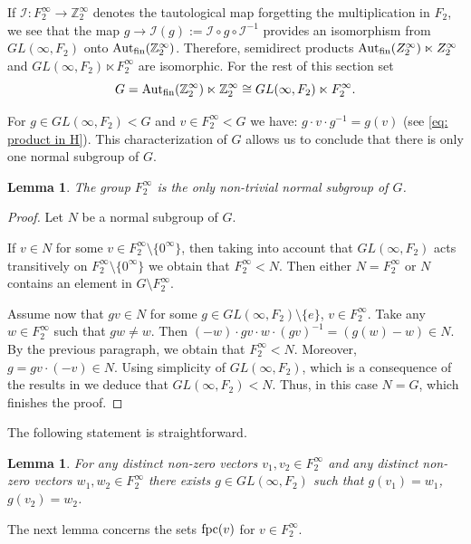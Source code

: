 \documentclass[11pt]{amsart}
\newcommand{\Z}{\mathbb Z}
\newcommand{\fpc}{{\rm fpc}}
\newcommand{\fin}{{\rm fin}}
\newcommand{\Aut}{\textup{Aut}}
\theoremstyle{plain}
\newtheorem{lemma}[theorem]{Lemma}
\theoremstyle{definition}
\theoremstyle{remark}
\numberwithin{equation}{section}
\begin{document}
If $\mathcal I:F_2^\infty\to \mathbb Z_2^\infty$ denotes the tautological map forgetting the multiplication in $F_2$, we see that the map $g\to\mathcal I(g):=\mathcal I\circ g\circ \mathcal I^{-1}$ provides an isomorphism from $GL(\infty, F_2)$ onto $\Aut_\fin (\mathbb Z_2^\infty)$. Therefore, semidirect  products $\Aut_\fin (Z_2^\infty)\ltimes Z_2^\infty$  and $GL(\infty,F_2)\ltimes F_2^\infty$ are isomorphic. For the rest of this section set 
\[ G = \Aut_\fin (\Z_2^\infty)\ltimes \Z_2^\infty \cong GL(\infty,F_2)\ltimes F_2^\infty.\]

	For $g\in GL(\infty, F_2)<G$ and $v\in F_2^\infty<G$ we have: $g\cdot v\cdot g^{-1}=g(v)$ (see \eqref{eq: product in H}).
This characterization of $G$ allows us to conclude that there is only one normal subgroup of $G$.
\begin{lemma}\label{lemma: normal subgroups of H}
	The group $F_2^\infty$ is the only non-trivial normal subgroup of $G$.
\end{lemma}
\begin{proof}
Let $N$ be a normal subgroup of $G$. 

If $v\in N$ for some $v\in F_2^\infty\setminus \{0^\infty\}$, then taking into account that $GL(\infty,F_2)$ acts transitively on $F_2^\infty\setminus \{0^\infty\}$ we obtain that $F_2^\infty<N$. Then either $N=F_2^\infty$ or $N$ contains an element in $G\setminus F_2^\infty$.


Assume now that $gv\in N$ for some $g\in GL(\infty,F_2)\setminus \{e\}$, $v\in F_2^\infty$. Take any $w\in F_2^\infty$ such that $gw\neq w$. Then $(-w)\cdot gv\cdot w\cdot (gv)^{-1}=(g(w)-w)\in N$. By the previous paragraph, we obtain that $F_2^\infty<N$. Moreover, $g=gv\cdot(-v)\in N$. Using simplicity of $GL(\infty,F_2)$, which is a consequence of the results in \cite[Chapter 8]{Rotman_book} we deduce that $GL(\infty,F_2)<N$. Thus, in this case $N=G$, which finishes the proof.
\end{proof}	
	 
The following statement is straightforward.
\begin{lemma}\label{lemma: disjoint subsets}
	For any distinct non-zero vectors $v_1,v_2\in F_2^\infty$ and any distinct non-zero vectors $w_1,w_2\in F_2^\infty$ there exists $g\in GL(\infty, F_2)$ such that $g(v_1)=w_1$, $g(v_2)=w_2$.
\end{lemma}

The next lemma concerns the sets $\fpc(v)$ for $v\in F_2^\infty$.
\end{document}
